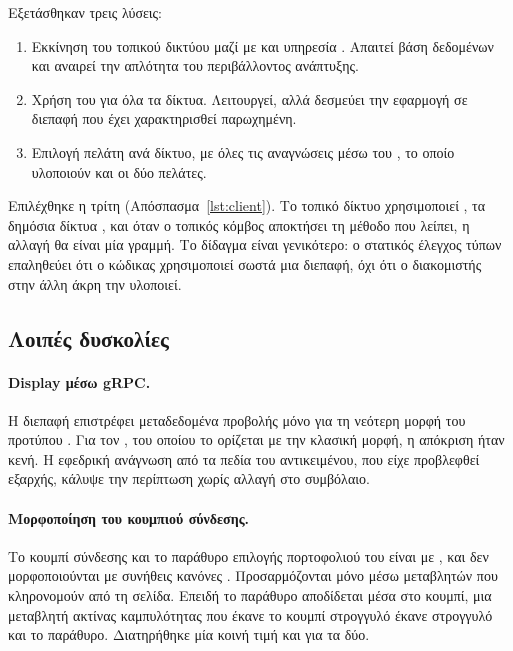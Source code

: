 Εξετάσθηκαν τρεις λύσεις:
\begin{enumerate}[nosep]
  \item Εκκίνηση του τοπικού δικτύου μαζί με  και υπηρεσία .
        Απαιτεί βάση δεδομένων και αναιρεί την απλότητα του περιβάλλοντος ανάπτυξης.
  \item Χρήση του  για όλα τα δίκτυα. Λειτουργεί, αλλά δεσμεύει την
        εφαρμογή σε διεπαφή που έχει χαρακτηρισθεί παρωχημένη.
  \item Επιλογή πελάτη ανά δίκτυο, με όλες τις αναγνώσεις μέσω του , το οποίο
        υλοποιούν και οι δύο πελάτες.
\end{enumerate}
Επιλέχθηκε η τρίτη (Απόσπασμα~\ref{lst:client}). Το τοπικό δίκτυο χρησιμοποιεί
, τα δημόσια δίκτυα , και όταν ο τοπικός κόμβος αποκτήσει τη μέθοδο
που λείπει, η αλλαγή θα είναι μία γραμμή. Το δίδαγμα είναι γενικότερο: ο στατικός έλεγχος
τύπων επαληθεύει ότι ο κώδικας χρησιμοποιεί σωστά μια διεπαφή, όχι ότι ο διακομιστής στην
άλλη άκρη την υλοποιεί.

\subsection{Λοιπές δυσκολίες}
\label{sec:other-difficulties}

\paragraph{Display μέσω gRPC.} Η διεπαφή  επιστρέφει μεταδεδομένα προβολής μόνο
για τη νεότερη μορφή του προτύπου . Για τον , του οποίου
το  ορίζεται με την κλασική μορφή, η απόκριση ήταν κενή. Η εφεδρική ανάγνωση
από τα πεδία του αντικειμένου, που είχε προβλεφθεί εξαρχής, κάλυψε την περίπτωση χωρίς
αλλαγή στο συμβόλαιο.

\paragraph{Μορφοποίηση του κουμπιού σύνδεσης.} Το κουμπί σύνδεσης και το παράθυρο επιλογής
πορτοφολιού του  είναι  με , και δεν
μορφοποιούνται με συνήθεις κανόνες . Προσαρμόζονται μόνο μέσω μεταβλητών που
κληρονομούν από τη σελίδα. Επειδή το παράθυρο αποδίδεται μέσα στο κουμπί, μια μεταβλητή
ακτίνας καμπυλότητας που έκανε το κουμπί στρογγυλό έκανε στρογγυλό και το παράθυρο.
Διατηρήθηκε μία κοινή τιμή και για τα δύο.

